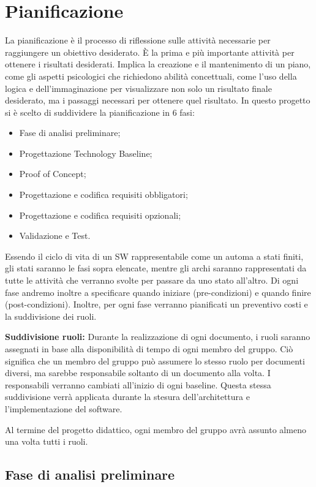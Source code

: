 \chapter{Pianificazione}
La pianificazione è il processo di riflessione sulle attività necessarie per raggiungere un obiettivo desiderato. È la prima e più importante attività per ottenere i risultati desiderati. Implica la creazione e il mantenimento di un piano, come gli aspetti psicologici che richiedono abilità concettuali, come l'uso della logica e dell'immaginazione per visualizzare non solo un risultato finale desiderato, ma i passaggi necessari per ottenere quel risultato. In questo progetto si è scelto di suddividere la pianificazione in 6 fasi: 
\begin{itemize}
    \item Fase di analisi preliminare;
    \item Progettazione Technology Baseline;
    \item Proof of Concept;
    \item Progettazione e codifica requisiti obbligatori;
    \item Progettazione e codifica requisiti opzionali;
    \item Validazione e Test.
\end{itemize}
Essendo il ciclo di vita di un SW rappresentabile come un automa a stati finiti, gli stati saranno le fasi sopra elencate, mentre gli archi saranno rappresentati da tutte le attività che verranno svolte per passare da uno stato all'altro. Di ogni fase andremo inoltre a specificare quando iniziare (pre-condizioni) e quando finire (post-condizioni).
Inoltre, per ogni fase verranno pianificati un preventivo costi e la suddivisione dei ruoli.

\textbf{Suddivisione ruoli:}
Durante la realizzazione di ogni documento, i ruoli saranno assegnati in base alla disponibilità di tempo di ogni membro del gruppo. Ciò significa che un membro del gruppo può assumere lo stesso ruolo per documenti diversi, ma sarebbe responsabile soltanto di un documento alla volta. I responsabili verranno cambiati all'inizio di ogni baseline. Questa stessa suddivisione verrà applicata durante la stesura dell'architettura e l'implementazione del software.

Al termine del progetto didattico, ogni membro del gruppo avrà assunto almeno una volta tutti i ruoli.

\section{Fase di analisi preliminare}

